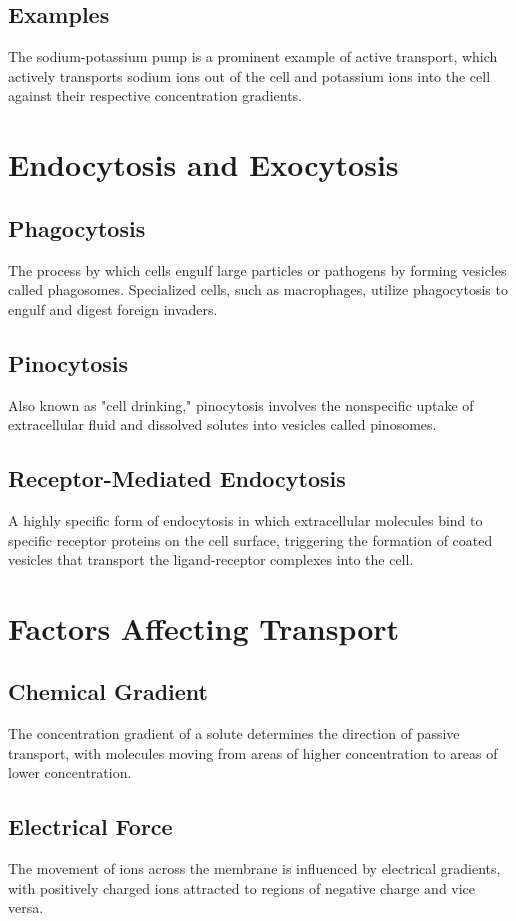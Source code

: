 \documentclass{article}
\begin{document}
\subsection{Examples}
The sodium-potassium pump is a prominent example of active transport, which actively transports sodium ions out of the cell and potassium ions into the cell against their respective concentration gradients.

\section{Endocytosis and Exocytosis}

\subsection{Phagocytosis}
The process by which cells engulf large particles or pathogens by forming vesicles called phagosomes. Specialized cells, such as macrophages, utilize phagocytosis to engulf and digest foreign invaders.

\subsection{Pinocytosis}
Also known as "cell drinking," pinocytosis involves the nonspecific uptake of extracellular fluid and dissolved solutes into vesicles called pinosomes.

\subsection{Receptor-Mediated Endocytosis}
A highly specific form of endocytosis in which extracellular molecules bind to specific receptor proteins on the cell surface, triggering the formation of coated vesicles that transport the ligand-receptor complexes into the cell.

\section{Factors Affecting Transport}

\subsection{Chemical Gradient}
The concentration gradient of a solute determines the direction of passive transport, with molecules moving from areas of higher concentration to areas of lower concentration.

\subsection{Electrical Force}
The movement of ions across the membrane is influenced by electrical gradients, with positively charged ions attracted to regions of negative charge and vice versa.
\end{document}
